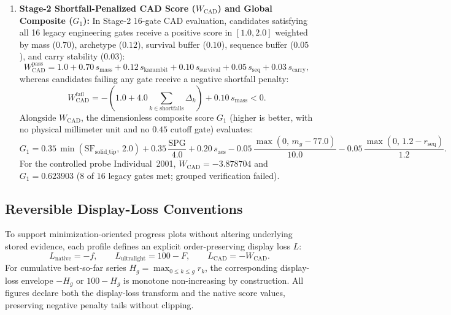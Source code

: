 \begin{enumerate}[leftmargin=*,nosep]
\item \textbf{Stage-2 Shortfall-Penalized CAD Score ($W_{\text{CAD}}$) and Global Composite ($G_1$):} In Stage-2 16-gate CAD evaluation, candidates satisfying all 16 legacy engineering gates receive a positive score in $[1.0,2.0]$ weighted by mass ($0.70$), archetype ($0.12$), survival buffer ($0.10$), sequence buffer ($0.05$), and carry stability ($0.03$):
\begin{equation}
 W_{\text{CAD}}^{\text{pass}} = 1.0 + 0.70\,s_{\text{mass}} + 0.12\,s_{\text{karambit}} + 0.10\,s_{\text{survival}} + 0.05\,s_{\text{seq}} + 0.03\,s_{\text{carry}},
\end{equation}
whereas candidates failing any gate receive a negative shortfall penalty:
\begin{equation}
 W_{\text{CAD}}^{\text{fail}} = -\left(1.0 + 4.0\sum_{k\in\text{shortfalls}}\Delta_k\right) + 0.10\,s_{\text{mass}} < 0.
\end{equation}
Alongside $W_{\text{CAD}}$, the dimensionless composite score $G_1$ (higher is better, with no physical millimeter unit and no $0.45$ cutoff gate) evaluates:
\begin{equation}
 G_1 = 0.35\,\min(\mathrm{SF}_{\text{solid\_tip}},\,2.0) + 0.35\,\frac{\mathrm{SPG}}{4.0} + 0.20\,s_{\text{aes}} - 0.05\,\frac{\max(0,\,m_g - 77.0)}{10.0} - 0.05\,\frac{\max(0,\,1.2 - r_{\text{seq}})}{1.2}.
\end{equation}
For the controlled probe Individual~2001, $W_{\text{CAD}} = -3.878704$ and $G_1 = 0.623903$ ($8$ of $16$ legacy gates met; grouped verification failed).
\end{enumerate}

\subsection{Reversible Display-Loss Conventions}
To support minimization-oriented progress plots without altering underlying stored evidence, each profile defines an explicit order-preserving display loss $L$:
\begin{equation}
 L_{\text{native}} = -f,\qquad L_{\text{ultralight}} = 100 - F,\qquad L_{\text{CAD}} = -W_{\text{CAD}}.
\end{equation}
For cumulative best-so-far series $H_g = \max_{0\le k\le g} r_k$, the corresponding display-loss envelope $-H_g$ or $100 - H_g$ is monotone non-increasing by construction. All figures declare both the display-loss transform and the native score values, preserving negative penalty tails without clipping.

